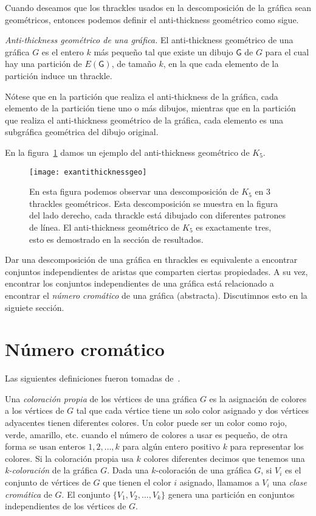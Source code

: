 Cuando deseamos que los thrackles usados en la descomposición de la gráfica sean
geométricos, entonces podemos definir el anti-thickness geométrico como sigue.
\begin{definition}{\emph{Anti-thickness geométrico de una gráfica.}}
El anti-thickness geométrico de una gráfica $G$ es el entero $k$ más pequeño
tal que existe un dibujo $\mathsf{G}$ de $G$ para el cual hay una partición de
$E(\mathsf{G})$, de tamaño $k$, en la que cada elemento de la partición induce
un thrackle.
\end{definition}
Nótese que en la partición que realiza el anti-thickness de la gráfica, cada
elemento de la partición tiene uno o más dibujos, mientras que en la partición
que realiza el anti-thickness geométrico de la gráfica, cada elemento es una
subgráfica geométrica del dibujo original.

En la figura~\ref{fig:exantithicknessgeo} damos un ejemplo del anti-thickness
geométrico de $K_5$.
\begin{figure}[htpb]
  \centering
  \texttt{[image: exantithicknessgeo]}
  \caption{En esta figura podemos observar una descomposición de $K_5$ en 3
  thrackles geométricos. Esta descomposición se muestra en la figura del lado
  derecho, cada thrackle está dibujado con diferentes patrones de línea. El
  anti-thickness geométrico de $K_5$ es exactamente tres, esto es demostrado en
  la sección de resultados.} %
  \label{fig:exantithicknessgeo}
\end{figure}

Dar una descomposición de una gráfica en thrackles es equivalente a encontrar
conjuntos independientes de aristas que comparten ciertas propiedades. A su vez,
encontrar los conjuntos independientes de una gráfica está relacionado a
encontrar el \emph{número cromático} de una gráfica (abstracta). Discutimnos
esto en la siguiete sección.

\section{Número cromático}
Las siguientes definiciones fueron tomadas de~\cite{Chartrand2008}.

Una \emph{coloración propia} de los vértices de una gráfica $G$ es la asignación
de colores a los vértices de $G$ tal que cada vértice tiene un solo color
asignado y dos vértices adyacentes tienen diferentes colores.
Un color puede ser un color como rojo, verde, amarillo, etc. cuando el número
de colores a usar es pequeño, de otra forma se usan enteros $1,2,\dots,k$
para algún entero positivo $k$ para representar los colores. Si la coloración
propia usa $k$ colores diferentes decimos que tenemos una \emph{k-coloración}
de la gráfica $G$. Dada una $k$-coloración de una gráfica $G$, si $V_i$ es el
conjunto de vértices de $G$ que tienen el color $i$ asignado, llamamos a $V_i$
una \emph{clase cromática} de $G$. El conjunto $\{V_1,V_2,\dots,V_k\}$ genera
una partición en conjuntos independientes de los vértices de $G$.

